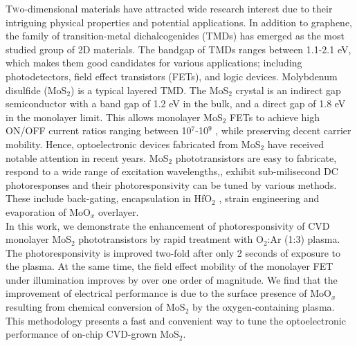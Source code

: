\documentclass[%
 reprint,
superscriptaddress,
 amsmath,amssymb,
 aps,
prb,
]{revtex4-1}
\begin{document}
\maketitle %



\lettrine[lines=2]{T}wo-dimensional materials have attracted wide research interest due to their intriguing physical properties and potential applications. In addition to graphene, the family of transition-metal dichalcogenides (TMDs) has emerged as the most studied group of 2D materials. The bandgap of TMDs ranges between 1.1-2.1 eV, \cite{wang2012electronics} which makes them good candidates for various applications; including photodetectors, \cite{Li2015, Miao2015, Qiu2014} field effect transistors (FETs), \cite{Radisavljevic2013} and logic devices.\cite{huang2013large} Molybdenum disulfide (MoS$_2$) is a typical layered TMD. The MoS$_2$ crystal is an indirect gap semiconductor with a band gap of 1.2 eV in the bulk, and a direct gap of 1.8 eV in the monolayer limit.\cite{Mak2010a} This allows monolayer MoS$_2$ FETs to achieve high ON/OFF current ratios ranging between 10$^7$-10$^9$ \cite{qiu2012electrical}, while preserving decent carrier mobility.
Hence, optoelectronic devices fabricated from MoS$_2$ have received notable attention in recent years. \cite{LopezSanchez2013, Chen2015, qin2016atomic} MoS$_2$ phototransistors are easy to fabricate, respond to a wide range of excitation wavelengths,\cite{LopezSanchez2013, Wang2015}, exhibit sub-milisecond DC photoresponses \cite{yore2017large} and their photoresponsivity can be tuned by various methods. These include back-gating,\cite{Yin2012} encapsulation in HfO$_2$ \cite{Kufer2015}, strain engineering \cite{wang2017thermally} and evaporation of MoO$_x$ overlayer.\cite{Yoo2017}\\
\indent In this work, we demonstrate the enhancement of photoresponsivity of CVD monolayer MoS$_2$ phototransistors by rapid treatment with O$_2$:Ar (1:3) plasma. The photoresponsivity is improved two-fold after only 2 seconds of exposure to the plasma. At the same time, the field effect mobility of the monolayer FET under illumination improves by over one order of magnitude. We find that the improvement of electrical performance is due to the surface presence of MoO$_x$ resulting from chemical conversion of MoS$_2$ by the oxygen-containing plasma. This methodology presents a fast and convenient way to tune the optoelectronic performance of on-chip CVD-grown MoS$_2$. \newline
\end{document}
